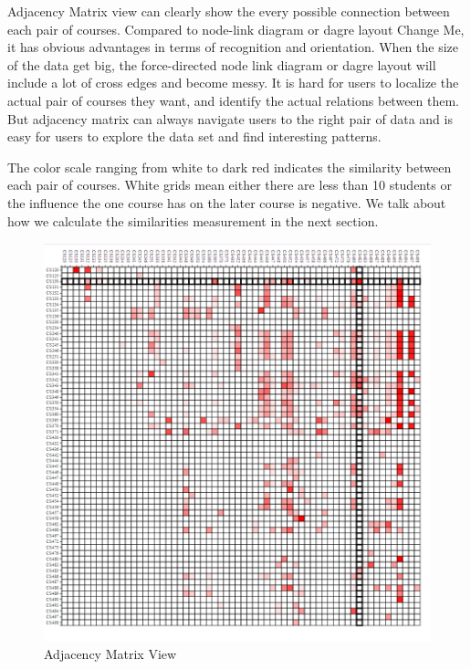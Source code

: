 Adjacency Matrix view can clearly show the every possible connection between each pair of courses. Compared to node-link diagram or dagre layout {Change Me}, it has obvious advantages in terms of recognition and orientation. When the size of the data get big, the force-directed node link diagram or dagre layout will include a lot of cross edges and become messy. It is hard for users to localize the actual pair of courses they want, and identify the actual relations between them. But adjacency matrix can always navigate users to the right pair of data and is easy for users to explore the data set and find interesting patterns. 

The color scale ranging from white to dark red indicates the similarity between each pair of courses. White grids mean either there are less than 10 students or the influence the one course has on the later course is negative. We talk about how we calculate the similarities measurement in the next section.
\begin{figure}[h]
	\centering %
	\includegraphics[width=\columnwidth]{figs/matrix} 
	\caption{Adjacency Matrix View}
	\label{fig:sample}
\end{figure}

